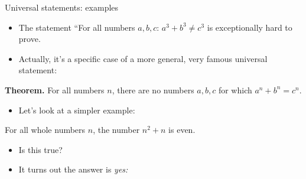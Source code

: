 \documentclass[11pt,aspectratio=1610]{beamer}
\begin{document}
		\begin{frame}{Universal statements: examples}
			\begin{itemize}\itemsep5mm
				\item The statement ``For all numbers $a,b,c$: $a^3 + b^3 \neq c^3$ is exceptionally hard to prove. \p
				\item Actually, it's a specific case of a more general, very famous universal statement: \p
			\end{itemize}\vspace{2mm}
			
			\textbf{Theorem.} For all numbers $n$, there are no numbers $a,b,c$ for which $a^n + b^n = c^n$. 
			\vspace{3mm}
			
			\begin{itemize}\p
				\item Let's look at a simpler example: 
			\end{itemize}
			\begin{example}
				For all whole numbers $n$, the number $n^2 + n$ is even. 
			\end{example}\p
			\begin{itemize}
				\item Is this true? \pause 
				\item It turns out the answer is \emph{yes:}
			\end{itemize}
		\end{frame}
		
\end{document}

